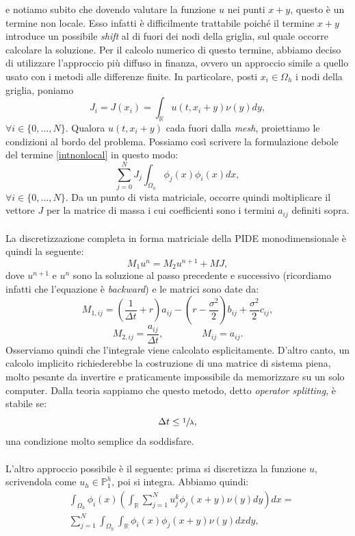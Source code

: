 \documentclass[a4paper,10pt]{report}
\theoremstyle{plain}
\theoremstyle{definition}
\theoremstyle{remark}
\begin{document}
e notiamo subito che dovendo valutare la funzione $u$ nei punti $x+y$, questo \`e un termine non locale. Esso infatti \`e difficilmente trattabile poich\'e il termine $x+y$ introduce un possibile \emph{shift} al di fuori dei nodi della griglia, sul quale occorre calcolare la soluzione. Per il calcolo numerico di questo termine, abbiamo deciso di utilizzare l'approccio pi\`u diffuso in finanza, ovvero un approccio simile a quello usato con i metodi alle differenze finite. In particolare, posti $x_i\in\Omega_h$ i nodi della griglia, poniamo $$J_i=J(x_i)=\int_\mathbb{R}u(t,x_i+y)\nu(y)dy,$$ $\forall i\in\{0,...,N\}.$ Qualora $u(t,x_i+y)$ cada fuori dalla \emph{mesh}, proiettiamo le condizioni al bordo del problema. Possiamo cos\`i scrivere la formulazione debole del termine \ref{intnonlocal} in questo modo: $$\sum_{j=0}^{N}J_j\int_{\Omega_h}\phi_j(x)\phi_i(x)dx,$$ $\forall i\in\{0,...,N\}.$ Da un punto di vista matriciale, occorre quindi moltiplicare il vettore $J$ per la matrice di massa i cui coefficienti sono i termini $a_{ij}$ definiti sopra.\\\\La discretizzazione completa in forma matriciale della PIDE monodimensionale \`e quindi la seguente:$$M_1u^n=M_2u^{n+1}+MJ,$$ dove $u^{n+1}$ e $u^n$ sono la soluzione al passo precedente e successivo (ricordiamo infatti che l'equazione \`e \emph{backward}) e le matrici sono date da: $$M_{1,ij}=\left(\frac{1}{\Delta t}+r\right)a_{ij}-\left(r-\frac{\sigma^2}{2}\right)b_{ij}+\frac{\sigma^2}{2}c_{ij},$$ $$M_{2,ij}=\frac{a_{ij}}{\Delta t},\qquad\qquad M_{ij}=a_{ij}.$$Osserviamo quindi che l'integrale viene calcolato esplicitamente. D'altro canto, un calcolo implicito richiederebbe la costruzione di una matrice di sistema piena, molto pesante da invertire e praticamente impossibile da memorizzare su un solo computer. Dalla teoria sappiamo che questo metodo, detto \emph{operator splitting}, \`e stabile se: $$\Delta t\leq\sfrac{1}{\lambda},$$una condizione molto semplice da soddisfare.\\\\L'altro approccio possibile \`e il seguente: prima si discretizza la funzione $u$, scrivendola come $u_h\in\mathbb{P}^h_1$, poi si integra. Abbiamo quindi:
\begin{align*}
&\int_{\Omega_h}\phi_i(x)\left( \int_{\mathbb{R}}\sum_{j=1}^N u_j^k \phi_j(x+y)\nu(y)dy \right)dx=\\ 
&\sum_{j=1}^N  \int_{\Omega_h}\int_{\mathbb{R}} \phi_i(x)\phi_j(x+y)\nu(y)dxdy,
\end{align*}
\end{document}
